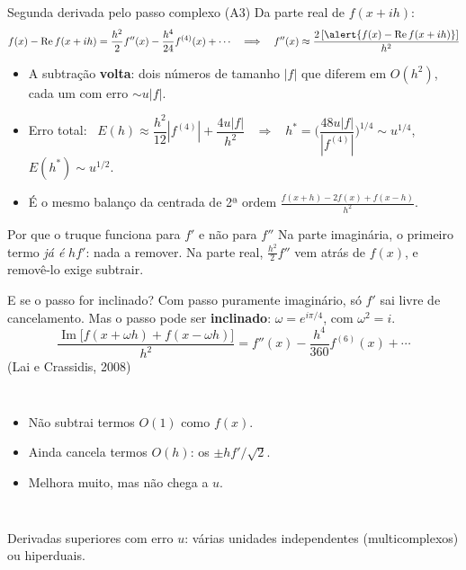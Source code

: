 \documentclass[aspectratio=169,11pt]{beamer}
\renewcommand{\Im}{\operatorname{Im}}
\renewcommand{\Re}{\operatorname{Re}}
\begin{document}
\begin{frame}{Segunda derivada pelo passo complexo (A3)}
  Da parte real de $f(x+ih)$:
  \[
    f(x)-\Re f(x+ih) = \frac{h^2}{2}f''(x) - \frac{h^4}{24}f^{(4)}(x)+\cdots
    \quad\Longrightarrow\quad
    f''(x)\approx\frac{2\,[\alert{f(x)-\Re f(x+ih)}]}{h^2}
  \]
  \begin{itemize}
    \item A subtração \textbf{volta}: dois números de tamanho $|f|$ que diferem em $O(h^2)$, cada um com erro $\sim u|f|$.
    \item Erro total: \ $E(h)\approx\dfrac{h^2}{12}|f^{(4)}| + \dfrac{4u|f|}{h^2}$ \ $\Rightarrow$ \ $h^\ast=\Big(\dfrac{48u|f|}{|f^{(4)}|}\Big)^{1/4}\sim u^{1/4}$, \ $E(h^\ast)\sim u^{1/2}$.
    \item É o mesmo balanço da centrada de 2ª ordem $\frac{f(x+h)-2f(x)+f(x-h)}{h^2}$.
  \end{itemize}
  \begin{block}{Por que o truque funciona para $f'$ e não para $f''$}
    Na parte imaginária, o primeiro termo \emph{já é} $hf'$: nada a remover. Na parte real, $\tfrac{h^2}{2}f''$ vem atrás de $f(x)$, e removê-lo exige subtrair.
  \end{block}
\end{frame}

\begin{frame}{E se o passo for inclinado?}
  Com passo puramente imaginário, só $f'$ sai livre de cancelamento. Mas o passo pode ser \textbf{inclinado}: $\omega = e^{i\pi/4}$, com $\omega^2=i$.
  \[
    \frac{\Im\big[f(x+\omega h) + f(x-\omega h)\big]}{h^2} = f''(x) - \frac{h^4}{360}f^{(6)}(x) + \cdots
  \]
  {\small (Lai e Crassidis, 2008)}
  \vspace{0.4em}
  \begin{columns}[T]
    \begin{itemize}
      \item Não subtrai termos $O(1)$ como $f(x)$.
      \item Ainda cancela termos $O(h)$: os $\pm hf'/\sqrt2$.
      \item Melhora muito, mas \alert{não chega a $u$}.
    \end{itemize}
  \end{columns}
  \vspace{0.6em}
  Derivadas superiores com erro $u$: várias unidades independentes (multicomplexos) ou hiperduais.
\end{frame}
\end{document}
